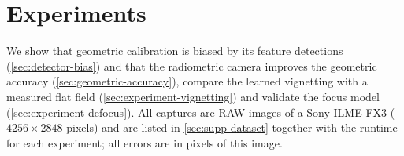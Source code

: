 \section{Experiments}
\label{sec:experiments}
\label{sec:dataset}
We show that geometric calibration is biased by its feature detections
(\cref{sec:detector-bias}) and that the radiometric camera improves
the geometric accuracy (\cref{sec:geometric-accuracy}), compare the
learned vignetting with a measured flat field
(\cref{sec:experiment-vignetting}) and validate the focus model
(\cref{sec:experiment-defocus}). All captures are RAW images of a Sony
ILME-FX3 ($4256\times2848$ pixels) and are listed in
\cref{sec:supp-dataset} together with the runtime for each experiment; all errors are in pixels of this image. 

\begin{table}[t]
        \centering
        
        \caption{Reprojection error on the held-out high-precision target, geometric start $\rightarrow$ radiometric refinement, for each camera model, lens and calibration target. The refined value is bold where it is significantly lower than the start and italic where it is significantly higher (95\,\% bootstrap interval of the difference, \cref{tab:supp-refinement-a}); the mean and the RMS are in \cref{tab:supp-refinement-b}. --: Brown--Conrady cannot represent the $180^\circ$ field of view of the fisheye.}
        \label{tab:refinement-chrome}
\end{table}
